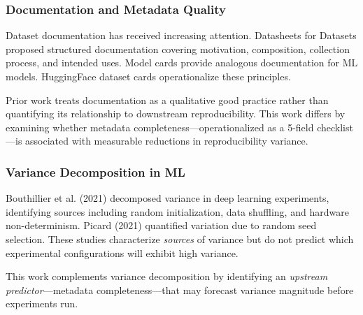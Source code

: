 \subsubsection{Documentation and Metadata Quality}

Dataset documentation has received increasing attention. Datasheets for Datasets \citep{gebru2021datasheets} proposed structured documentation covering motivation, composition, collection process, and intended uses. Model cards \citep{mitchell2019model} provide analogous documentation for ML models. HuggingFace dataset cards operationalize these principles.

Prior work treats documentation as a qualitative good practice rather than quantifying its relationship to downstream reproducibility. This work differs by examining whether metadata completeness---operationalized as a 5-field checklist---is associated with measurable reductions in reproducibility variance.

\subsubsection{Variance Decomposition in ML}

Bouthillier et al. (2021) decomposed variance in deep learning experiments, identifying sources including random initialization, data shuffling, and hardware non-determinism. Picard (2021) quantified variation due to random seed selection. These studies characterize \textit{sources} of variance but do not predict which experimental configurations will exhibit high variance.

This work complements variance decomposition by identifying an \textit{upstream predictor}---metadata completeness---that may forecast variance magnitude before experiments run.

